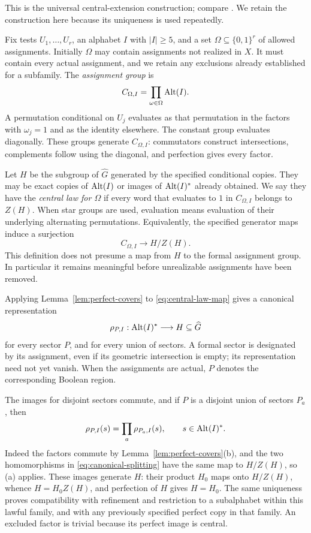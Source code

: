 This is the universal central-extension construction; compare
\cite[Construction~6.9.3 and Theorem~6.9.5]{Weibel1994}.
We retain the construction here
because its uniqueness is used repeatedly.

Fix tests $U_1,\ldots,U_r$, an alphabet $I$ with $|I|\ge5$, and a
set $\Omega\subseteq\{0,1\}^r$ of allowed assignments.  Initially
$\Omega$ may contain assignments not realized in $X$.  It must
contain every actual assignment, and we retain any exclusions
already established for a subfamily.  The \emph{assignment group} is
\[
 C_{\Omega,I}=\prod_{\omega\in\Omega}\operatorname{Alt}(I).
\]
A permutation conditional on $U_j$ evaluates as that permutation
in the factors with $\omega_j=1$ and as the identity elsewhere.
The constant group evaluates diagonally.  These groups generate
$C_{\Omega,I}$: commutators construct intersections, complements
follow using the diagonal, and perfection gives every factor.

Let $H$ be the subgroup of $\widehat G$ generated by the specified
conditional copies.  They may be exact copies of $\operatorname{Alt}(I)$ or
images of $\operatorname{Alt}(I)^\ast$ already obtained.  We say they have the
\emph{central law for $\Omega$} if every word that evaluates to
$1$ in $C_{\Omega,I}$ belongs to $Z(H)$.  When star groups are
used, evaluation means evaluation of their underlying alternating
permutations.  Equivalently, the specified generator maps induce
a surjection
\begin{equation}\label{eq:central-law-map}
 C_{\Omega,I}\longrightarrow H/Z(H).
\end{equation}
This definition does not presume a map from $H$ to the formal
assignment group.  In particular it remains meaningful before
unrealizable assignments have been removed.

Applying Lemma~\ref{lem:perfect-covers} to
\eqref{eq:central-law-map} gives a canonical representation
\begin{equation}\label{eq:sector-representation}
 \rho_{P,I}:\operatorname{Alt}(I)^\ast\longrightarrow H\subseteq\widehat G
\end{equation}
for every sector $P$, and for every union of sectors.  A formal
sector is designated by its assignment, even if its geometric
intersection is empty; its representation need not yet vanish.
When the assignments are actual, $P$ denotes the corresponding
Boolean region.

The images for disjoint sectors commute, and if $P$ is a disjoint
union of sectors $P_a$, then
\begin{equation}\label{eq:canonical-splitting}
 \rho_{P,I}(s)=\prod_a\rho_{P_a,I}(s),
 \qquad s\in\operatorname{Alt}(I)^\ast.
\end{equation}
Indeed the factors commute by Lemma~\ref{lem:perfect-covers}(b),
and the two homomorphisms in \eqref{eq:canonical-splitting} have
the same map to $H/Z(H)$, so (a) applies.  These images generate
$H$: their product $H_0$ maps onto $H/Z(H)$, whence
$H=H_0Z(H)$, and perfection of $H$ gives $H=H_0$.  The same
uniqueness proves compatibility with refinement and restriction to a
subalphabet within this lawful family, and with any previously specified
perfect copy in that family.
An excluded factor is trivial because
its perfect image is central.

